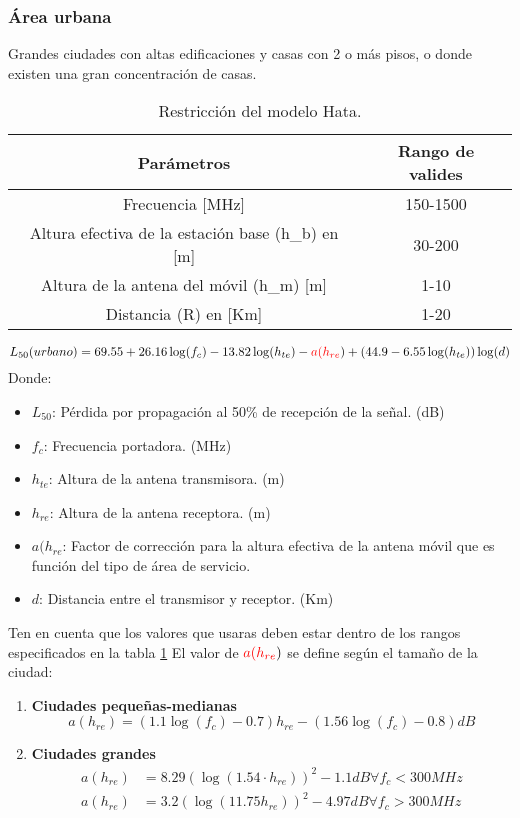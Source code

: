 \documentclass[
	12pt, %
	fleqn, %
	a4paper, %
	oneside, %
]{LegrandOrangeBook}
\begin{document}
\subsubsection{Área urbana}
Grandes ciudades con altas edificaciones y casas con 2 o más pisos, o donde existen una gran concentración de casas.
\begin{table}[H]
\centering
\begin{tabular}{|c|c|}
\hline
Parámetros                                            & Rango de valides \\ \hline
Frecuencia {[}MHz{]}                                  & 150-1500         \\ \hline
Altura efectiva de la estación base (h\_b) en {[}m{]} & 30-200           \\ \hline
Altura de la antena del móvil (h\_m) {[}m{]}          & 1-10             \\ \hline
Distancia (R) en {[}Km{]}                             & 1-20             \\ \hline
\end{tabular}
\caption{Restricción del modelo Hata.}
\label{tab:modeloHata}
\end{table}
\begin{equation}
L_{50} (urbano)=69.55+26.16\log(f_c)-13.82\log(h_{te})-\textcolor{red}{a(h_{re}})+(44.9-6.55\log(h_{te}))\log(d)
\label{eq: area urbana}
\end{equation}
Donde:
\begin{itemize}
\item $L_{50}$: Pérdida por propagación al 50\% de recepción de la señal. (dB)
\item $f_c$: Frecuencia portadora. (MHz)
\item $h_{te}$: Altura de la antena transmisora. (m)
\item $h_{re}$: Altura de la antena receptora. (m)
\item $a(h_{re}$: Factor de corrección para la altura efectiva de la antena móvil que es función del tipo de área de servicio.
\item $d$: Distancia entre el transmisor y receptor. (Km)
\end{itemize}
Ten en cuenta que los valores que usaras deben estar dentro de los rangos especificados en la tabla \ref{tab:modeloHata}
El valor de $\textcolor{red}{a(h_{re}})$ se define según el tamaño de la ciudad:
\begin{enumerate}
\item \textbf{Ciudades pequeñas-medianas}
\begin{equation}
a(h_{re})=(1.1\log(f_c)-0.7)h_{re}-(1.56\log(f_c)-0.8) dB
\end{equation}
\item \textbf{Ciudades grandes}
\begin{align}
a(h_{re})&=8.29(\log(1.54\cdot h_{re}))^2-1.1 dB \forall f_c <300 MHz\\
a(h_{re})&=3.2(\log(11.75h_{re}))^2-4.97 dB \forall f_c >300 MHz
\end{align}
\end{enumerate}
\end{document}
